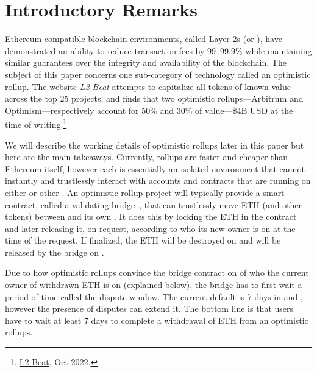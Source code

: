 \section{Introductory Remarks}

Ethereum-compatible blockchain environments, called Layer 2s (or \layertwos), have demonstrated an ability to reduce transaction fees by 99--99.9\% while maintaining similar guarantees over the integrity and availability of the blockchain. The subject of this paper concerns one sub-category of \layertwo technology called an optimistic rollup. The website \textit{L2 Beat} attempts to capitalize all tokens of known value across the top 25 \layertwo projects, and finds that two optimistic rollups---Arbitrum and Optimism---respectively account for 50\% and 30\% of \layertwo value---\$4B USD at the time of writing.\footnote{\href{https://l2beat.com/scaling/tvl/}{L2 Beat}, Oct 2022.}

We will describe the working details of optimistic rollups later in this paper but here are the main takeaways. Currently, rollups are faster and cheaper than Ethereum itself, however each \layertwo is essentially an isolated environment that cannot instantly and trustlessly interact with accounts and contracts that are running on either \layerone or other \layertwos. An optimistic rollup project will typically provide a smart contract, called a validating bridge~\cite{mccorry2021sok}, that can trustlessly move ETH (and other tokens) between \layerone and its own \layertwo. It does this by locking the ETH in the \layerone contract and later releasing it, on request, according to who its new owner is on \layertwo at the time of the request. If finalized, the ETH will be destroyed on \layertwo and will be released by the bridge on \layerone.

Due to how optimistic rollups convince the bridge contract on \layerone of who the current owner of withdrawn ETH is on \layertwo (explained below), the bridge has to first wait a period of time called the dispute window. The current default is 7 days in \arb and \opt, however the presence of disputes can extend it. The bottom line is that users have to wait at least 7 days to complete a withdrawal of ETH from an optimistic rollups. 

